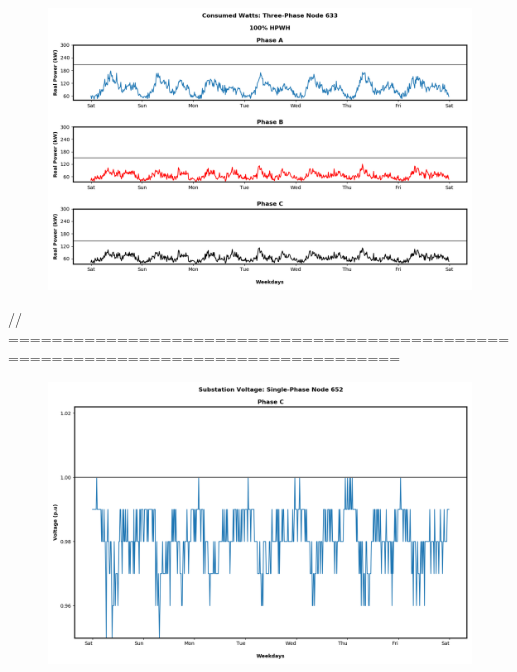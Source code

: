\begin{figure}[H]
    \centering
    \includegraphics[width=1.1\columnwidth]{Pictures/hundred_three_phase_633_power.png}
    \caption{ }
\end{figure}



// ==================================================================================

\begin{figure}[H]
    \centering
    \includegraphics[width=1.1\columnwidth]{Pictures/basecase_single_phase_652_volt.png}
    \caption{ }
\end{figure}

\newpage


